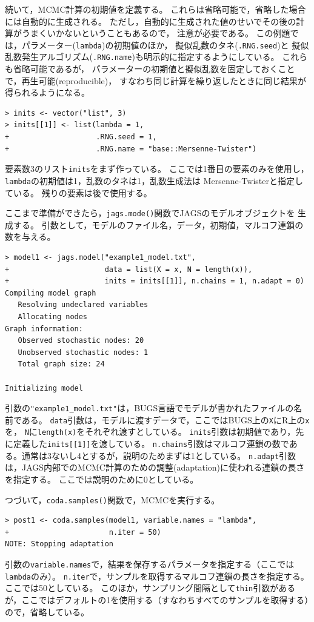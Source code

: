 \documentclass[11pt,uplatex]{jsarticle}
\begin{document}
続いて，MCMC計算の初期値を定義する。
これらは省略可能で，省略した場合には自動的に生成される。
ただし，自動的に生成された値のせいでその後の計算がうまくいかないということもあるので，
注意が必要である。
この例題では，パラメーター(\texttt{lambda})の初期値のほか，
擬似乱数のタネ(\texttt{.RNG.seed})と
擬似乱数発生アルゴリズム(\texttt{.RNG.name})も明示的に指定するようにしている。
これらも省略可能であるが，
パラメーターの初期値と擬似乱数を固定しておくことで，再生可能(reproducible)，
すなわち同じ計算を繰り返したときに同じ結果が得られるようになる。
%
\begin{lstlisting}
> inits <- vector("list", 3)
> inits[[1]] <- list(lambda = 1,
+                    .RNG.seed = 1,
+                    .RNG.name = "base::Mersenne-Twister")
\end{lstlisting}
%
要素数3のリスト\texttt{inits}をまず作っている。
ここでは1番目の要素のみを使用し，
\texttt{lambda}の初期値は1，乱数のタネは1，乱数生成法は Mersenne-Twisterと指定している。
残りの要素は後で使用する。

ここまで準備ができたら，\texttt{jags.mode()}関数でJAGSのモデルオブジェクトを
生成する。
引数として，モデルのファイル名，データ，初期値，マルコフ連鎖の数を与える。
\begin{lstlisting}
> model1 <- jags.model("example1_model.txt",
+                      data = list(X = x, N = length(x)),
+                      inits = inits[[1]], n.chains = 1, n.adapt = 0)
Compiling model graph
   Resolving undeclared variables
   Allocating nodes
Graph information:
   Observed stochastic nodes: 20
   Unobserved stochastic nodes: 1
   Total graph size: 24

Initializing model

\end{lstlisting}
%
引数の\texttt{"example1\_model.txt"}は，BUGS言語でモデルが書かれたファイルの名前である。
\texttt{data}引数は，モデルに渡すデータで，ここではBUGS上の\texttt{X}に\textsf{R}上の\texttt{x}を，
\texttt{N}に\texttt{length(x)}をそれぞれ渡すとしている。
\texttt{inits}引数は初期値であり，先に定義した\texttt{inits[[1]]}を渡している。
\texttt{n.chains}引数はマルコフ連鎖の数である。通常は3ないし4とするが，説明のためまずは1としている。
\texttt{n.adapt}引数は，\textsf{JAGS}内部でのMCMC計算のための調整(adaptation)に使われる連鎖の長さを指定する。
ここでは説明のために0としている。

つづいて，\texttt{coda.samples()}関数で，MCMCを実行する。
\begin{lstlisting}
> post1 <- coda.samples(model1, variable.names = "lambda",
+                       n.iter = 50)
NOTE: Stopping adaptation

\end{lstlisting}
%
引数の\texttt{variable.names}で，結果を保存するパラメータを指定する（ここでは\texttt{lambda}のみ）。
\texttt{n.iter}で，サンプルを取得するマルコフ連鎖の長さを指定する。ここでは50としている。
このほか，サンプリング間隔として\texttt{thin}引数があるが，ここではデフォルトの1を使用する（すなわちすべてのサンプルを取得する）ので，省略している。
\end{document}
